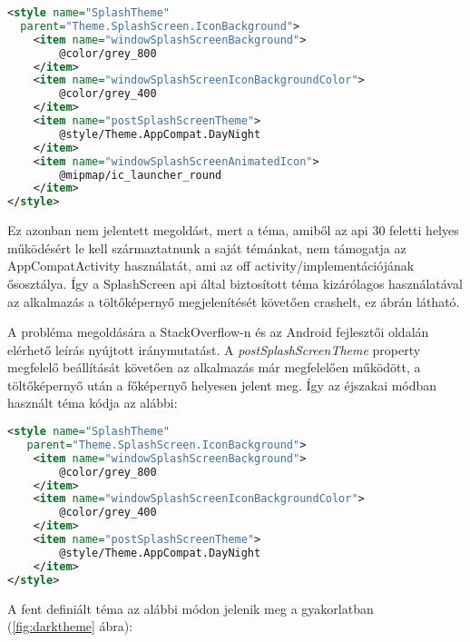 \begin{lstlisting}[frame=single,language=xml,emph={style,item},
    emphstyle=\color{BurntOrange}\textbf,stringstyle=\color{OliveGreen}\textbf]
<style name="SplashTheme"
  parent="Theme.SplashScreen.IconBackground">
    <item name="windowSplashScreenBackground">
        @color/grey_800
    </item>
    <item name="windowSplashScreenIconBackgroundColor">
        @color/grey_400
    </item>
    <item name="postSplashScreenTheme">
        @style/Theme.AppCompat.DayNight
    </item>
    <item name="windowSplashScreenAnimatedIcon">
        @mipmap/ic_launcher_round
    </item>
</style>
\end{lstlisting}

Ez azonban nem jelentett megoldást, mert a téma, amiből az \acrshort{api} 30 feletti helyes működésért
le kell származtatnunk a saját témánkat, nem támogatja az AppCompatActivity használatát, ami
az \acrlong{off} activity\-/implementációjának ősosztálya. Így a SplashScreen \acrshort{api} által biztosított
téma kizárólagos használatával az alkalmazás a töltőképernyő megjelenítését követően crashelt,
ez \az{\ref{fig:appcompatcrash}} ábrán látható.

A probléma megoldására a StackOverflow-n és az Android fejlesztői oldalán elérhető leírás
nyújtott iránymutatást. A \textit{postSplashScreenTheme} property megfelelő beállítását követően
az alkalmazás már megfelelően működött, a töltőképernyő után a főképernyő helyesen jelent meg.
Így az éjszakai módban használt téma kódja az alábbi:

\begin{lstlisting}[frame=single,language=xml,emph={style,item},
    emphstyle=\color{BurntOrange}\textbf,stringstyle=\color{OliveGreen}\textbf]
 <style name="SplashTheme"
   parent="Theme.SplashScreen.IconBackground">
    <item name="windowSplashScreenBackground">
        @color/grey_800
    </item>
    <item name="windowSplashScreenIconBackgroundColor">
        @color/grey_400
    </item>
    <item name="postSplashScreenTheme">
        @style/Theme.AppCompat.DayNight
    </item>
</style>
\end{lstlisting}

A fent definiált téma az alábbi módon jelenik meg a gyakorlatban (\ref{fig:darktheme} ábra):


